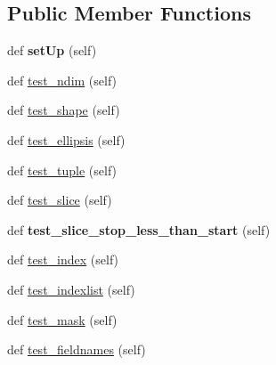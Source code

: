 \subsection*{Public Member Functions}
\begin{DoxyCompactItemize}
\item 
\mbox{\label{classh5py__LOCAL_1_1tests_1_1hl_1_1test__dataset__getitem_1_1Test1DZeroFloat_a05d3725405ccc6bbee2f91631bde1838}} 
def {\bfseries set\+Up} (self)
\item 
def \hyperlink{classh5py__LOCAL_1_1tests_1_1hl_1_1test__dataset__getitem_1_1Test1DZeroFloat_a01e33620a1ca7bff170ed7c80feeec52}{test\+\_\+ndim} (self)
\item 
def \hyperlink{classh5py__LOCAL_1_1tests_1_1hl_1_1test__dataset__getitem_1_1Test1DZeroFloat_af0270de49f522d2ae8d831c8d3831487}{test\+\_\+shape} (self)
\item 
def \hyperlink{classh5py__LOCAL_1_1tests_1_1hl_1_1test__dataset__getitem_1_1Test1DZeroFloat_a0f300770c32df2673c99a426209780cc}{test\+\_\+ellipsis} (self)
\item 
def \hyperlink{classh5py__LOCAL_1_1tests_1_1hl_1_1test__dataset__getitem_1_1Test1DZeroFloat_a6127e6e4ca4006c7a315ea8b131dd431}{test\+\_\+tuple} (self)
\item 
def \hyperlink{classh5py__LOCAL_1_1tests_1_1hl_1_1test__dataset__getitem_1_1Test1DZeroFloat_a09f65ed254315fdd9e5859b7b22288d9}{test\+\_\+slice} (self)
\item 
\mbox{\label{classh5py__LOCAL_1_1tests_1_1hl_1_1test__dataset__getitem_1_1Test1DZeroFloat_a9baa6db9ddcf6ae6c6c5bbcde8f56653}} 
def {\bfseries test\+\_\+slice\+\_\+stop\+\_\+less\+\_\+than\+\_\+start} (self)
\item 
def \hyperlink{classh5py__LOCAL_1_1tests_1_1hl_1_1test__dataset__getitem_1_1Test1DZeroFloat_aef1c21af6aa7e16520f53f3edc28c39e}{test\+\_\+index} (self)
\item 
def \hyperlink{classh5py__LOCAL_1_1tests_1_1hl_1_1test__dataset__getitem_1_1Test1DZeroFloat_a8ffbd77db89ccffc9942b65dc17fd324}{test\+\_\+indexlist} (self)
\item 
def \hyperlink{classh5py__LOCAL_1_1tests_1_1hl_1_1test__dataset__getitem_1_1Test1DZeroFloat_ad7ba036f2c65638bc10b734da2509ddb}{test\+\_\+mask} (self)
\item 
def \hyperlink{classh5py__LOCAL_1_1tests_1_1hl_1_1test__dataset__getitem_1_1Test1DZeroFloat_aa0ce684c15f79e08d213387a8cef4903}{test\+\_\+fieldnames} (self)
\end{DoxyCompactItemize}
